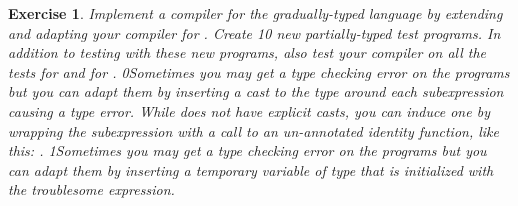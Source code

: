 \documentclass[7x10]{TimesAPriori_MIT}%
\def\racketEd{0}
\def\pythonEd{1}
\def\edition{0}
\newcommand{\racket}[1]{{\if\edition\racketEd{#1}\fi}}
\newcommand{\python}[1]{{\if\edition\pythonEd #1\fi}}
\newtheorem{exercise}[theorem]{Exercise}
\numberwithin{theorem}{chapter}
\numberwithin{definition}{chapter}
\numberwithin{equation}{chapter}
\begin{document}
\begin{exercise}\normalfont\normalsize
  Implement a compiler for the gradually-typed \LangGrad{} language by
  extending and adapting your compiler for \LangLam{}. Create 10 new
  partially-typed test programs. In addition to testing with these
  new programs, also test your compiler on all the tests for \LangLam{}
  and for \LangDyn{}.
%
  \racket{Sometimes you may get a type checking error on the
    \LangDyn{} programs but you can adapt them by inserting a cast to
    the \CANYTY{} type around each subexpression causing a type
    error. While \LangDyn{} does not have explicit casts, you can
    induce one by wrapping the subexpression \code{e} with a call to
    an un-annotated identity function, like this: \code{((lambda (x) x) e)}.}
%
  \python{Sometimes you may get a type checking error on the
    \LangDyn{} programs but you can adapt them by inserting a
    temporary variable of type \CANYTY{} that is initialized with the
    troublesome expression.}
\end{exercise}
\end{document}
